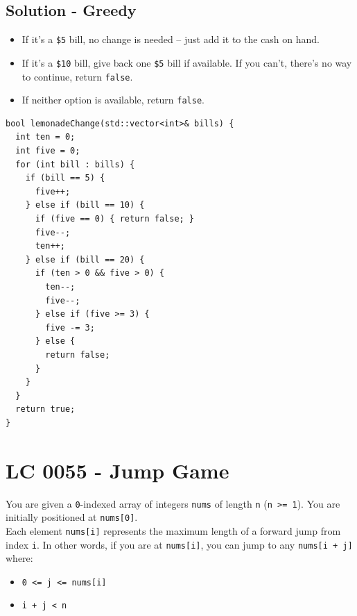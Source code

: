 \subsection*{Solution - Greedy}
\begin{itemize}
\item If it's a {\colorbox{CodeBackground}{\lstinline|$5|}} bill, no change is needed -- just add it to the cash on hand.
\item If it's a {\colorbox{CodeBackground}{\lstinline|$10|}} bill, give back one {\colorbox{CodeBackground}{\lstinline|$5|}} bill if available. If you can't, there's no way to continue, return {\colorbox{CodeBackground}{\lstinline|false|}}.
\item {} If neither option is available, return {\colorbox{CodeBackground}{\lstinline|false|}}.
\end{itemize}
\begin{lstlisting}
bool lemonadeChange(std::vector<int>& bills) {
  int ten = 0;
  int five = 0;
  for (int bill : bills) {
    if (bill == 5) {
      five++;
    } else if (bill == 10) {
      if (five == 0) { return false; }
      five--;
      ten++;
    } else if (bill == 20) {
      if (ten > 0 && five > 0) {
        ten--;
        five--;
      } else if (five >= 3) {
        five -= 3;
      } else {
        return false;
      }
    }
  }
  return true;
}
\end{lstlisting}

\section{LC 0055 - Jump Game}\label{lc0055}
You are given a {\colorbox{CodeBackground}{\lstinline|0|}}-indexed array of integers {\colorbox{CodeBackground}{\lstinline|nums|}} of length {\colorbox{CodeBackground}{\lstinline|n|}} ({\colorbox{CodeBackground}{\lstinline|n >= 1|}}). You are initially positioned at {\colorbox{CodeBackground}{\lstinline|nums[0]|}}. \\

Each element {\colorbox{CodeBackground}{\lstinline|nums[i]|}} represents the maximum length of a forward jump from index {\colorbox{CodeBackground}{\lstinline|i|}}. In other words, if you are at {\colorbox{CodeBackground}{\lstinline|nums[i]|}}, you can jump to any {\colorbox{CodeBackground}{\lstinline|nums[i + j]|}} where:
\begin{itemize}
	\item {\colorbox{CodeBackground}{\lstinline|0 <= j <= nums[i]|}}
	\item {\colorbox{CodeBackground}{\lstinline|i + j < n|}}
\end{itemize}


